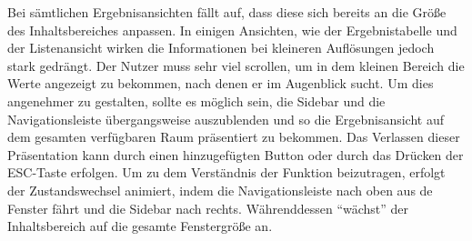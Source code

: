 Bei sämtlichen Ergebnisansichten fällt auf, dass diese sich bereits an die Größe des Inhaltsbereiches anpassen. In einigen Ansichten, wie der Ergebnistabelle und der Listenansicht wirken die Informationen bei kleineren Auflösungen jedoch stark gedrängt. Der Nutzer muss sehr viel scrollen, um in dem kleinen Bereich die Werte angezeigt zu bekommen, nach denen er im Augenblick sucht. Um dies angenehmer zu gestalten, sollte es möglich sein, die Sidebar und die Navigationsleiste übergangsweise auszublenden und so die Ergebnisansicht auf dem gesamten verfügbaren Raum präsentiert zu bekommen. Das Verlassen dieser Präsentation kann durch einen hinzugefügten Button oder durch das Drücken der ESC-Taste erfolgen. Um zu dem Verständnis der Funktion beizutragen, erfolgt der Zustandswechsel animiert, indem die Navigationsleiste nach oben aus de Fenster fährt und die Sidebar nach rechts. Währenddessen \enquote{wächst} der Inhaltsbereich auf die gesamte Fenstergröße an.\par
